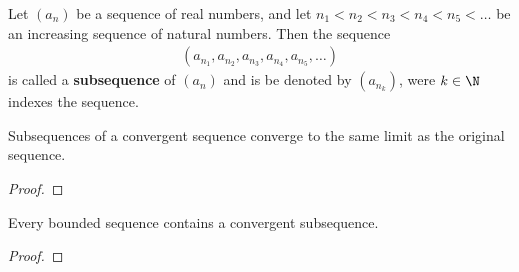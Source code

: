 \begin{definition}[Subsequence]
	Let $\left( a_n \right) $ be a sequence of real numbers, and let $n_{1} < n_2 < n_3 < n_4 < n_5 < \ldots$ be an increasing sequence of natural numbers. Then the sequence 
	\begin{align}
		\left( a_{n_{1}}, a_{n_{2}}, a_{n_{3}}, a_{n_{4}}, a_{n_{5}}, \ldots \right) 
	\end{align}
	is called a \textbf{subsequence} of $\left( a_n \right) $ and is be denoted by $\left( a_{n_{k}} \right) $, were $k \in  \N$ indexes the sequence.
\end{definition}

\begin{theorem}
	Subsequences of a convergent sequence converge to the same limit as the original sequence.
\end{theorem}

\begin{proof}
\end{proof}

\begin{theorem}
	Every bounded sequence contains a convergent subsequence. 	
\end{theorem}

\begin{proof}
\end{proof}


